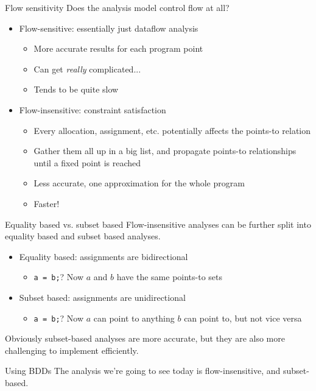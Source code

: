 \documentclass{beamer}
\begin{document}
\begin{frame}{Flow sensitivity}
Does the analysis model control flow at all?
\begin{itemize}
\item Flow-sensitive: essentially just dataflow analysis
    \begin{itemize}
    \item More accurate results for each program point
    \item Can get \emph{really} complicated...
    \item Tends to be quite slow
    \end{itemize}
\item Flow-insensitive: constraint satisfaction
  \begin{itemize}
    \item Every allocation, assignment, etc. potentially affects the
          points-to relation
    \item Gather them all up in a big list, and propagate points-to
          relationships until a fixed point is reached
    \item Less accurate, one approximation for the whole program
    \item Faster!
  \end{itemize}
\end{itemize}
\end{frame}

\begin{frame}{Equality based vs. subset based}
Flow-insensitive analyses can be further split into equality based and
subset based analyses.
\begin{itemize}
\item Equality based: assignments are bidirectional
  \begin{itemize}
  \item {\tt a = b;}? Now $a$ and $b$ have the same points-to sets
  \end{itemize}
\item Subset based: assignments are unidirectional
  \begin{itemize}
  \item {\tt a = b;}? Now $a$ can point to anything $b$ can point to, but not vice versa
  \end{itemize}
\end{itemize}
Obviously subset-based analyses are more accurate, but they are also more
challenging to implement efficiently.
\end{frame}

\begin{frame}{Using BDDs}
The analysis we're going to see today is flow-insensitive, and subset-based.

\end{frame}
\end{document}
